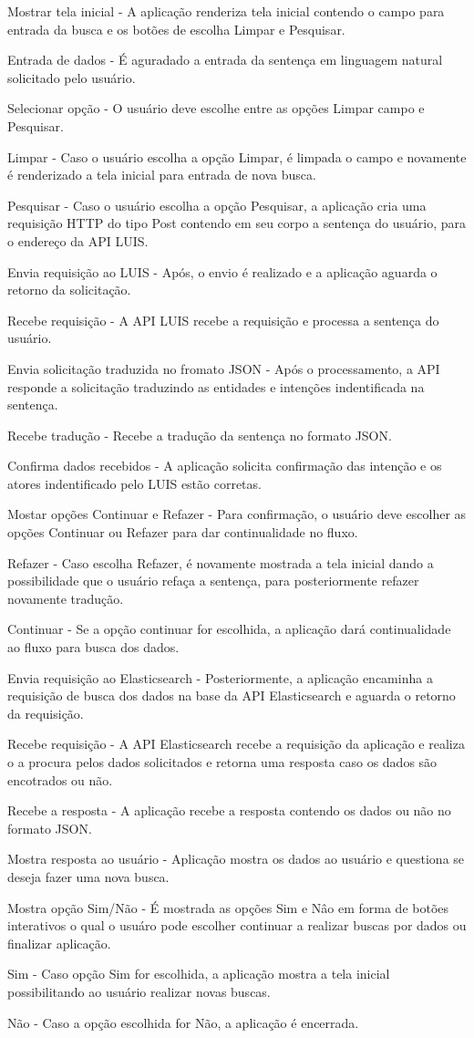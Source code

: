	Mostrar tela inicial - A aplicação renderiza tela inicial contendo o campo para entrada da busca e os botões de escolha Limpar e Pesquisar.

	Entrada de dados - É aguradado a entrada da sentença em linguagem natural solicitado pelo usuário.

	Selecionar opção - O usuário deve escolhe entre as opções Limpar campo e Pesquisar.

	Limpar - Caso o usuário escolha a opção Limpar, é limpada o campo e novamente é renderizado a tela inicial para entrada de nova busca.

	Pesquisar - Caso o usuário escolha a opção Pesquisar, a aplicação cria uma requisição HTTP do tipo Post contendo em seu corpo a sentença do usuário, para o endereço da API LUIS.

	Envia requisição ao LUIS - Após, o envio é realizado e a aplicação aguarda o retorno da solicitação.

	Recebe requisição - A API LUIS recebe a requisição e processa a sentença do usuário.

	Envia solicitação traduzida no fromato JSON - Após o processamento, a API responde a solicitação traduzindo as entidades e intenções indentificada na sentença.

	Recebe tradução - Recebe a tradução da sentença no formato JSON.

	Confirma dados recebidos - A aplicação solicita confirmação das intenção e os atores indentificado pelo LUIS estão corretas.

	Mostar opções Continuar e Refazer - Para confirmação, o usuário deve escolher as opções Continuar ou Refazer para dar continualidade no fluxo.

	Refazer - Caso escolha Refazer, é novamente mostrada a tela inicial dando a possibilidade que o usuário refaça a sentença, para posteriormente refazer novamente tradução.

	Continuar - Se a opção continuar for escolhida, a aplicação dará continualidade ao fluxo para busca dos dados.

	Envia requisição ao Elasticsearch - Posteriormente, a aplicação encaminha a requisição  de busca dos dados na base da API Elasticsearch e aguarda o retorno da requisição.

	Recebe requisição - A API Elasticsearch recebe a requisição da aplicação e realiza o a procura pelos dados solicitados e retorna uma resposta caso os dados são encotrados ou não.

	Recebe a resposta - A aplicação recebe a resposta contendo os dados ou não no formato JSON.

	Mostra resposta ao usuário - Aplicação mostra os dados ao usuário e questiona se deseja fazer uma nova busca.

	Mostra opção Sim/Não - É mostrada as opções Sim e Nâo em forma de botões interativos o qual o usuáro pode escolher continuar a realizar buscas por dados ou finalizar aplicação.

	Sim - Caso opção Sim for escolhida, a aplicação mostra a tela inicial possibilitando ao usuário realizar novas buscas.

	Não - Caso a opção escolhida for Não, a aplicação é encerrada.
